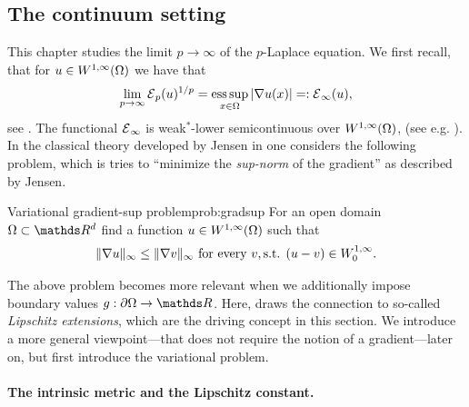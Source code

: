 \subsection{The continuum setting}\label{sec:LipExtCont}
%
%
This chapter studies the limit $p\to\infty$ of the $p$-Laplace equation. We first recall, that for 
$u\in W^{1,\infty}(\Omega)$ we have that
%
\begin{align*}
\lim_{p\to\infty} \mathcal{E}{}_p(u)^{1/p} = \operatorname*{ess\,sup}_{x\in\Omega} \left|\nabla u(x)\right| =: \mathcal{E}{}_\infty(u),
\end{align*}
%
see \cite{jensen1993uniqueness}. The functional $\mathcal{E}{}_\infty$ is weak$^*$-lower semicontinuous over $W^{1,\infty}(\Omega)$, 
(see e.g. \cite[Thm. 2.6]{barron2001lower}). In the classical theory developed by Jensen in \cite{jensen1993uniqueness} one considers the following problem, which is tries to \enquote{minimize the \emph{sup-norm} of the gradient} as described by Jensen.
%
\begin{problem}{Variational gradient-sup problem}{prob:gradsup}
For an open domain $\domain\subset\R^d$ find a function $u\in W^{1,\infty}(\Omega)$ such that
%
\begin{align*}
\|\nabla u\|_\infty \leq \|\nabla v\|_\infty \text{ for every } v, \text{s.t. } (u-v)\in W^{1,\infty}_0.
\end{align*}
\end{problem}
%
The above problem becomes more relevant when we additionally impose boundary values $g:\partial\domain\to\R$. Here, \cite{jensen1993uniqueness} draws the connection to so-called \emph{Lipschitz extensions}, which are the driving concept in this section. We introduce a more general viewpoint---that does not require the notion of a gradient---later on, but first introduce the variational problem. 

\paragraph{The intrinsic metric and the Lipschitz constant.}

